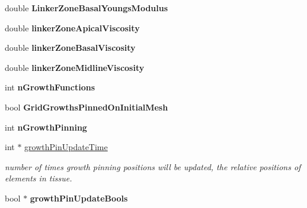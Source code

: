 \begin{DoxyCompactItemize}
\item 
\hypertarget{classSimulation_a07cf19fd8a3e78d4644563b3c9c030ee}{}double {\bfseries Linker\+Zone\+Basal\+Youngs\+Modulus}\label{classSimulation_a07cf19fd8a3e78d4644563b3c9c030ee}

\item 
\hypertarget{classSimulation_a8f11d2644c957402cd0e6e1b4c652182}{}double {\bfseries linker\+Zone\+Apical\+Viscosity}\label{classSimulation_a8f11d2644c957402cd0e6e1b4c652182}

\item 
\hypertarget{classSimulation_af7b9b2275582a0d94b6ac6709b0f73eb}{}double {\bfseries linker\+Zone\+Basal\+Viscosity}\label{classSimulation_af7b9b2275582a0d94b6ac6709b0f73eb}

\item 
\hypertarget{classSimulation_a5810bcef5e865af1cdbfb8e0586fa12d}{}double {\bfseries linker\+Zone\+Midline\+Viscosity}\label{classSimulation_a5810bcef5e865af1cdbfb8e0586fa12d}

\item 
\hypertarget{classSimulation_a47187b5d7f450b1c41e6fdaffeedc207}{}int {\bfseries n\+Growth\+Functions}\label{classSimulation_a47187b5d7f450b1c41e6fdaffeedc207}

\item 
\hypertarget{classSimulation_ae83cadb5675d5ef391adb5d1595070ec}{}bool {\bfseries Grid\+Growths\+Pinned\+On\+Initial\+Mesh}\label{classSimulation_ae83cadb5675d5ef391adb5d1595070ec}

\item 
\hypertarget{classSimulation_a505b17bf704f4ee58df2490b993c8f15}{}int {\bfseries n\+Growth\+Pinning}\label{classSimulation_a505b17bf704f4ee58df2490b993c8f15}

\item 
\hypertarget{classSimulation_ad10d69d485e1a0d697bb8f1ac63565b5}{}int $\ast$ \hyperlink{classSimulation_ad10d69d485e1a0d697bb8f1ac63565b5}{growth\+Pin\+Update\+Time}\label{classSimulation_ad10d69d485e1a0d697bb8f1ac63565b5}

\begin{DoxyCompactList}\small\item\em number of times growth pinning positions will be updated, the relative positions of elements in tissue. \end{DoxyCompactList}\item 
\hypertarget{classSimulation_ac5534e0153184948ec416030ce5be4f1}{}bool $\ast$ {\bfseries growth\+Pin\+Update\+Bools}\label{classSimulation_ac5534e0153184948ec416030ce5be4f1}


\end{DoxyCompactItemize}
